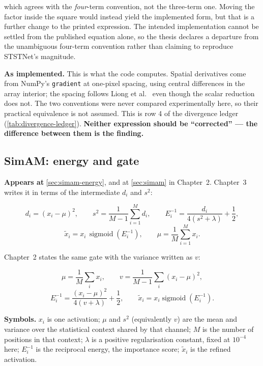 which agrees with the \emph{four}-term convention, not the three-term one.
Moving the factor inside the square would instead yield the implemented form,
but that is a further change to the printed expression. The intended
implementation cannot be settled from the published equation alone, so the
thesis declares a departure from the unambiguous four-term convention rather
than claiming to reproduce STSTNet's magnitude.

\textbf{As implemented.} This is what the code computes. Spatial derivatives
come from NumPy's \texttt{gradient} at one-pixel spacing, using central
differences in the array interior; the spacing follows Liong et
al.~\cite{liong2014a} even though the scalar reduction does not. The two
conventions were never compared experimentally here, so their practical
equivalence is not assumed. This is row 4 of the divergence ledger
(\autoref{tab:divergence-ledger}). \textbf{Neither expression should be
``corrected'' --- the difference between them is the finding.}

\subsection{SimAM: energy and gate}
\label{eq:simam}

\textbf{Appears at} \autoref{sec:simam-energy}, and at \autoref{sec:simam} in
Chapter~2. Chapter~3 writes it in terms of the intermediate $d_i$ and $s^2$:

\[
    d_i=(x_i-\mu)^2,\qquad
    s^2=\frac{1}{M-1}\sum_{i=1}^{M}d_i,\qquad
    E_i^{-1}=\frac{d_i}{4(s^2+\lambda)}+\frac{1}{2},
\]
\[
    \widetilde{x}_i=x_i\,\operatorname{sigmoid}(E_i^{-1}),
    \qquad \mu=\frac{1}{M}\sum_{i=1}^{M}x_i.
\]

Chapter~2 states the same gate with the variance written as $v$:

\[
    \mu=\frac1M\sum_i x_i,\qquad
    v=\frac1{M-1}\sum_i(x_i-\mu)^2,
\]
\[
    E_i^{-1}=\frac{(x_i-\mu)^2}{4(v+\lambda)}+\frac12,
    \qquad \widetilde x_i=x_i\operatorname{sigmoid}(E_i^{-1}).
\]

\textbf{Symbols.} $x_i$ is one activation; $\mu$ and $s^2$ (equivalently $v$)
are the mean and variance over the statistical context shared by that
channel; $M$ is the number of positions in that context; $\lambda$ is a
positive regularisation constant, fixed at $10^{-4}$ here; $E_i^{-1}$ is the
reciprocal energy, the importance score; $\widetilde{x}_i$ is the refined
activation.

